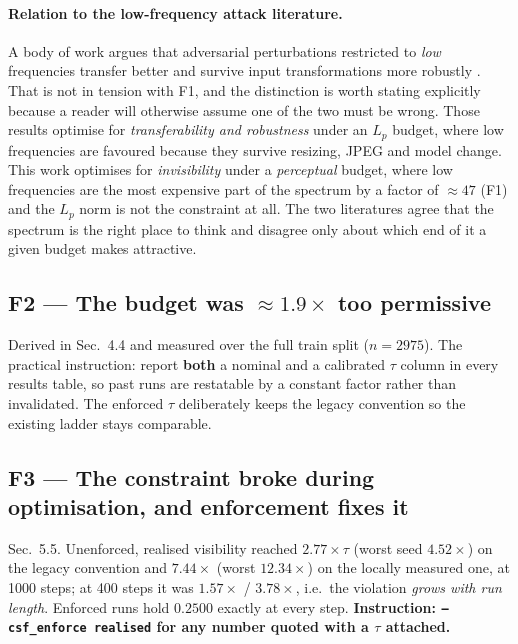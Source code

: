 \documentclass[11pt,a4paper]{article}
\begin{document}
\paragraph{Relation to the low-frequency attack literature.}
A body of work argues that adversarial perturbations restricted to
\emph{low} frequencies transfer better and survive input transformations
more robustly \citep{guo2020lowfreq,sharma2019spectral}. That is not in
tension with F1, and the distinction is worth stating explicitly because a
reader will otherwise assume one of the two must be wrong. Those results
optimise for \emph{transferability and robustness} under an $L_p$ budget,
where low frequencies are favoured because they survive resizing, JPEG and
model change. This work optimises for \emph{invisibility} under a
\emph{perceptual} budget, where low frequencies are the most expensive part
of the spectrum by a factor of $\approx47$ (F1) and the $L_p$ norm is not
the constraint at all. The two literatures agree that the spectrum is the
right place to think and disagree only about which end of it a given budget
makes attractive.

\subsection{F2 --- The budget was $\approx1.9\times$ too permissive}

Derived in Sec.~4.4 and measured over the full train split ($n=2975$). The
practical instruction: report \textbf{both} a nominal and a calibrated
$\tau$ column in every results table, so past runs are restatable by a
constant factor rather than invalidated. The enforced $\tau$ deliberately
keeps the legacy convention so the existing ladder stays comparable.

\subsection{F3 --- The constraint broke during optimisation, and
enforcement fixes it}

Sec.~5.5. Unenforced, realised visibility reached $2.77\times\tau$ (worst
seed $4.52\times$) on the legacy convention and $7.44\times$ (worst
$12.34\times$) on the locally measured one, at 1000 steps; at 400 steps it
was $1.57\times$ / $3.78\times$, i.e.\ the violation \emph{grows with run
length}. Enforced runs hold $0.2500$ exactly at every step.
\textbf{Instruction: \texttt{--csf\_enforce realised} for any number quoted
with a $\tau$ attached.}
\end{document}
